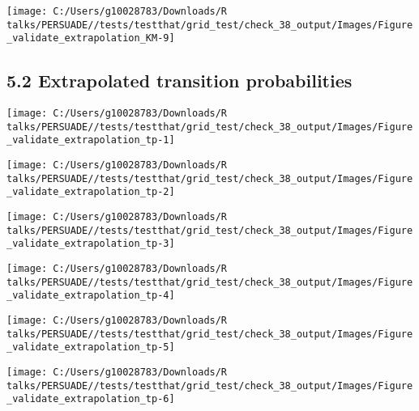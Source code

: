 \documentclass[
]{article}
\begin{document}
\begin{flushleft}\texttt{[image: C:/Users/g10028783/Downloads/R talks/PERSUADE//tests/testthat/grid\_test/check\_38\_output/Images/Figure\_validate\_extrapolation\_KM-9]} \end{flushleft}

\clearpage

\subsection{5.2 Extrapolated transition
probabilities}\label{extrapolated-transition-probabilities}

\begin{flushleft}\texttt{[image: C:/Users/g10028783/Downloads/R talks/PERSUADE//tests/testthat/grid\_test/check\_38\_output/Images/Figure\_validate\_extrapolation\_tp-1]} \end{flushleft}

\begin{flushleft}\texttt{[image: C:/Users/g10028783/Downloads/R talks/PERSUADE//tests/testthat/grid\_test/check\_38\_output/Images/Figure\_validate\_extrapolation\_tp-2]} \end{flushleft}

\begin{flushleft}\texttt{[image: C:/Users/g10028783/Downloads/R talks/PERSUADE//tests/testthat/grid\_test/check\_38\_output/Images/Figure\_validate\_extrapolation\_tp-3]} \end{flushleft}

\begin{flushleft}\texttt{[image: C:/Users/g10028783/Downloads/R talks/PERSUADE//tests/testthat/grid\_test/check\_38\_output/Images/Figure\_validate\_extrapolation\_tp-4]} \end{flushleft}

\begin{flushleft}\texttt{[image: C:/Users/g10028783/Downloads/R talks/PERSUADE//tests/testthat/grid\_test/check\_38\_output/Images/Figure\_validate\_extrapolation\_tp-5]} \end{flushleft}

\begin{flushleft}\texttt{[image: C:/Users/g10028783/Downloads/R talks/PERSUADE//tests/testthat/grid\_test/check\_38\_output/Images/Figure\_validate\_extrapolation\_tp-6]} \end{flushleft}
\end{document}
